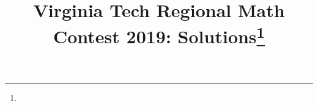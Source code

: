\documentclass[10pt]{article}
\begin{document}
\title{Virginia Tech Regional Math Contest 2019: Solutions\footnote{\disclaimer}}
\author{\vspace{-2ex}}
\date{\vspace{-5ex}} %
\maketitle

%

%

%

%

%

%

%
\end{document}
